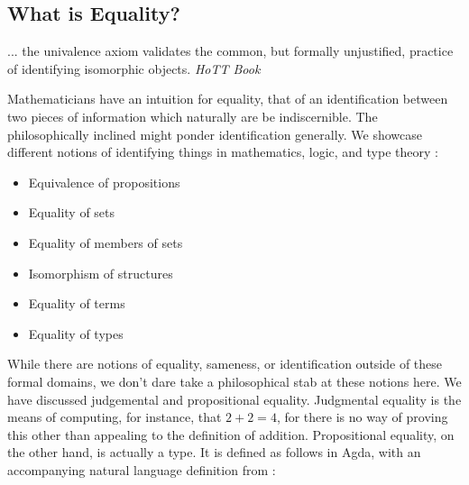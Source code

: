 \subsection{What is Equality?} \label{e}

\begin{displayquote}
... the univalence axiom validates the common, but formally unjustified, practice
of identifying isomorphic objects. \emph{HoTT Book} \cite{theunivalentfoundationsprogram-homotopytypetheory-2013}
\end{displayquote}

Mathematicians have an intuition for equality, that of an identification between
two pieces of information which naturally are be indiscernible. The
philosophically inclined might ponder identification generally. We showcase
different notions of identifying things in mathematics, logic, and type theory :

\begin{itemize}
\item Equivalence of propositions
\item Equality of sets
\item Equality of members of sets
\item Isomorphism of structures
\item Equality of terms
\item Equality of types
\end{itemize}

While there are notions of equality, sameness, or identification outside of
these formal domains, we don't dare take a philosophical stab at these notions
here. We have discussed judgemental and propositional equality. Judgmental
equality is the means of computing, for instance, that $2+2=4$, for there is no
way of proving this other than appealing to the definition of addition.
Propositional equality, on the other hand, is actually a type. It is defined as
follows in Agda, with an accompanying natural language definition from \cite{theunivalentfoundationsprogram-homotopytypetheory-2013} :

